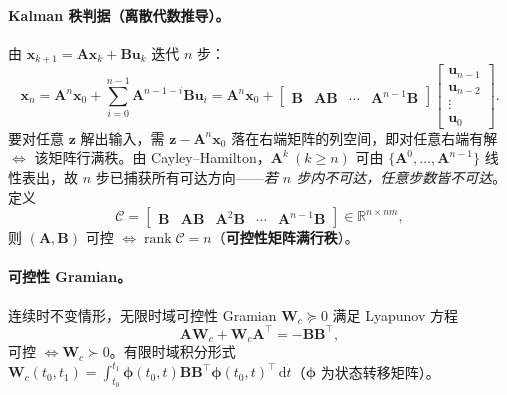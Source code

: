 \paragraph{Kalman 秩判据（离散代数推导）。}
由 $\mathbf{x}_{k+1}=\mathbf{A}\mathbf{x}_k+\mathbf{B}\mathbf{u}_k$ 迭代 $n$ 步\cite{rawlings2020mpc}：
\begin{equation}
  \mathbf{x}_n=\mathbf{A}^n\mathbf{x}_0+\sum_{i=0}^{n-1}\mathbf{A}^{n-1-i}\mathbf{B}\mathbf{u}_i
  =\mathbf{A}^n\mathbf{x}_0+\begin{bmatrix}\mathbf{B}&\mathbf{A}\mathbf{B}&\cdots&\mathbf{A}^{n-1}\mathbf{B}\end{bmatrix}
  \begin{bmatrix}\mathbf{u}_{n-1}\\\mathbf{u}_{n-2}\\\vdots\\\mathbf{u}_0\end{bmatrix}.
  \label{eq:ctrl-reach}
\end{equation}
要对任意 $\mathbf{z}$ 解出输入，需 $\mathbf{z}-\mathbf{A}^n\mathbf{x}_0$ 落在右端矩阵的列空间，即对任意右端有解 $\iff$ 该矩阵行满秩。由 Cayley--Hamilton，$\mathbf{A}^k\ (k\ge n)$ 可由 $\{\mathbf{A}^0,\dots,\mathbf{A}^{n-1}\}$ 线性表出，故 $n$ 步已捕获所有可达方向——\emph{若 $n$ 步内不可达，任意步数皆不可达}。定义
\begin{equation}
  \boxed{\mathcal{C}=\begin{bmatrix}\mathbf{B}&\mathbf{A}\mathbf{B}&\mathbf{A}^2\mathbf{B}&\cdots&\mathbf{A}^{n-1}\mathbf{B}\end{bmatrix}\in\mathbb{R}^{n\times nm},}
  \label{eq:ctrl-cmat}
\end{equation}
则 $(\mathbf{A},\mathbf{B})$ 可控 $\iff\operatorname{rank}\mathcal{C}=n$（\textbf{可控性矩阵满行秩}）。

\paragraph{可控性 Gramian。}
连续时不变情形，无限时域可控性 Gramian $\mathbf{W}_c\succeq0$ 满足 Lyapunov 方程\cite{rawlings2020mpc}
\begin{equation}
  \mathbf{A}\mathbf{W}_c+\mathbf{W}_c\mathbf{A}^\top=-\mathbf{B}\mathbf{B}^\top,
  \label{eq:ctrl-gramian}
\end{equation}
可控 $\iff\mathbf{W}_c\succ0$。有限时域积分形式 $\mathbf{W}_c(t_0,t_1)=\int_{t_0}^{t_1}\boldsymbol{\phi}(t_0,t)\mathbf{B}\mathbf{B}^\top\boldsymbol{\phi}(t_0,t)^\top\,\mathrm dt$（$\boldsymbol{\phi}$ 为状态转移矩阵）。

